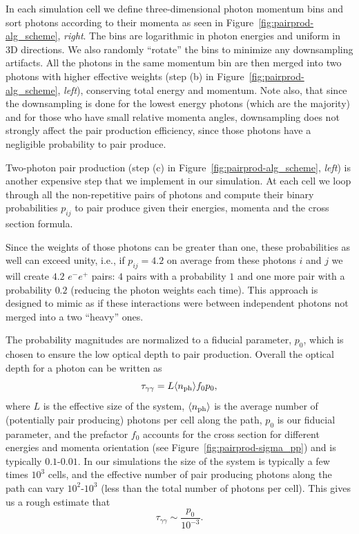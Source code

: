 In each simulation cell we define three-dimensional photon momentum bins and sort photons according to their momenta as seen in Figure~\ref{fig:pairprod-alg_scheme}, {\it right}. The bins are logarithmic in photon energies and uniform in 3D directions. We also randomly ``rotate'' the bins to minimize any downsampling artifacts. All the photons in the same momentum bin are then merged into two photons with higher effective weights (step (b) in Figure~\ref{fig:pairprod-alg_scheme}, {\it left}), conserving total energy and momentum. Note also, that since the downsampling is done for the lowest energy photons (which are the majority) and for those who have small relative momenta angles, downsampling does not strongly affect the pair production efficiency, since those photons have a negligible probability to pair produce.

Two-photon pair production (step (c) in Figure~\ref{fig:pairprod-alg_scheme}, {\it left}) is another expensive step that we implement in our simulation. At each cell we loop through all the non-repetitive pairs of photons and compute their binary probabilities $p_{ij}$ to pair produce given their energies, momenta and the cross section formula.

Since the weights of those photons can be greater than one, these probabilities as well can exceed unity, i.e., if $p_{ij}=4.2$ on average from these photons $i$ and $j$ we will create $4.2$ $e^-e^+$ pairs: $4$ pairs with a probability $1$ and one more pair with a probability $0.2$ (reducing the photon weights each time). This approach is designed to mimic as if these interactions were between independent photons not merged into a two ``heavy'' ones.

The probability magnitudes are normalized to a fiducial parameter, $p_0$, which is chosen to ensure the low optical depth to pair production. Overall the optical depth for a photon can be written as
\begin{equation}
    \tau_{\gamma\gamma} = L\langle n_{\rm ph}\rangle f_0 p_0,
\end{equation}
where $L$ is the effective size of the system, $\langle n_{\rm ph}\rangle$ is the average number of (potentially pair producing) photons per cell along the path, $p_0$ is our fiducial parameter, and the prefactor $f_0$ accounts for the cross section for different energies and momenta orientation (see Figure~\ref{fig:pairprod-sigma_pp}) and is typically $0.1\text{-}0.01$. In our simulations the size of the system is typically a few times $10^3$ cells, and the effective number of pair producing photons along the path can vary $10^2\text{-}10^3$ (less than the total number of photons per cell). This gives us a rough estimate that
\begin{equation}
    \tau_{\gamma\gamma} \sim \frac{p_0}{10^{-3}}.
\end{equation}

